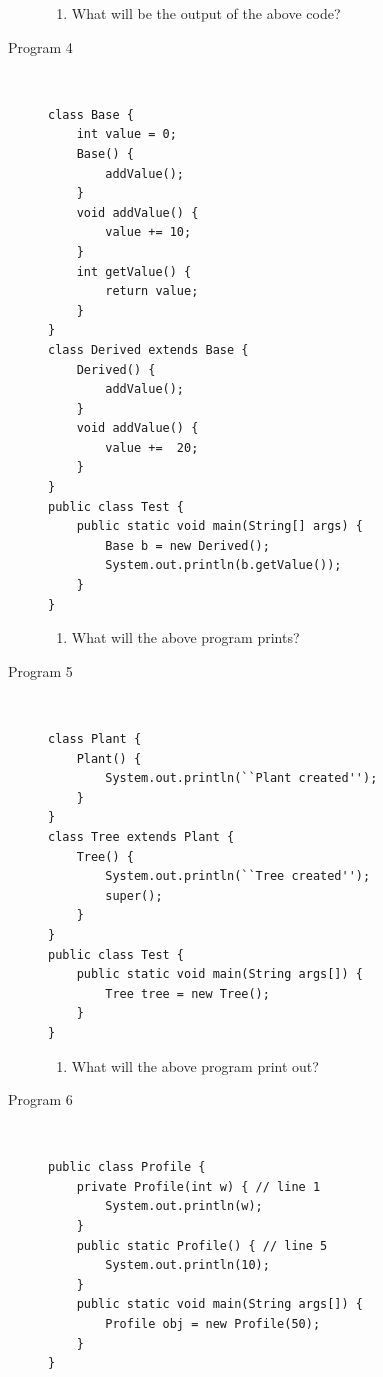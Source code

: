 \documentclass[11pt,a4paper]{article}
\def\AnswerBox{\fbox{\begin{minipage}{4in}\hfill\vspace{0.5in}\end{minipage}}}
\begin{document}
\begin{description}
\AnswerBox

\begin{enumerate}[label=\bfseries Q\arabic*:]\itemsep10pt 
        \item What will be the output of the above code?
    \end{enumerate}

\item[Program 4] \
    \begin{lstlisting}
class Base {
    int value = 0;
    Base() {
        addValue();
    }
    void addValue() {
        value += 10;
    }
    int getValue() {
        return value;
    }
}
class Derived extends Base {
    Derived() {
        addValue();
    }
    void addValue() {
        value +=  20;
    }
}
public class Test {
    public static void main(String[] args) {
        Base b = new Derived();
        System.out.println(b.getValue());
    }
}
\end{lstlisting}

\AnswerBox

\begin{enumerate}[label=\bfseries Q\arabic*:]\itemsep10pt
  \item What will the above program prints?
\end{enumerate}

\item [Program 5] \

\begin{lstlisting}
class Plant {
    Plant() {
        System.out.println(``Plant created'');
    }
}
class Tree extends Plant {
    Tree() {
        System.out.println(``Tree created'');
        super();
    }
}
public class Test {
    public static void main(String args[]) {
        Tree tree = new Tree();
    }
}
\end{lstlisting}

\AnswerBox

\begin{enumerate}[label=\bfseries Q\arabic*:]\itemsep10pt
 \item What will the above program print out?
\end{enumerate}

\item [Program 6] \
\begin{lstlisting}
public class Profile {
    private Profile(int w) { // line 1
        System.out.println(w);
    }
    public static Profile() { // line 5
        System.out.println(10);
    }
    public static void main(String args[]) {
        Profile obj = new Profile(50);
    }
}
\end{lstlisting}


\end{description}
\end{document}
